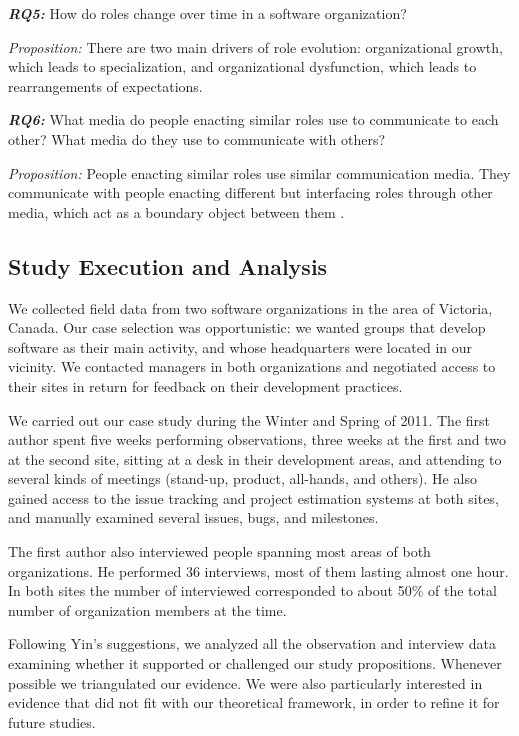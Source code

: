 \documentclass[10pt, conference, compsocconf]{IEEEtran}
\begin{document}
\textbf{\emph{RQ5:}} How do roles change over time in a software organization?

\emph{Proposition:} There are two main drivers of role evolution: organizational growth, which leads to specialization, and organizational dysfunction, which leads to rearrangements of expectations.

\textbf{\emph{RQ6:}} What media do people enacting similar roles use to communicate to each other? What media do they use to communicate with others?

\emph{Proposition:} People enacting similar roles use similar communication media. They communicate with people enacting different but interfacing roles through other media, which act as a boundary object between them \cite{Bowker1999}.



\subsection{Study Execution and Analysis}

We collected field data from two software organizations in the area of Victoria, Canada. Our case selection was opportunistic: we wanted groups that develop software as their main activity, and whose headquarters were located in our vicinity. We contacted managers in both organizations and negotiated access to their sites in return for feedback on their development practices.

We carried out our case study during the Winter and Spring of 2011. The first author spent five weeks performing observations, three weeks at the first and two at the second site, sitting at a desk in their development areas, and attending to several kinds of meetings (stand-up, product, all-hands, and others). He also gained access to the issue tracking and project estimation systems at both sites, and manually examined several issues, bugs, and milestones.

The first author also interviewed people spanning most areas of both organizations. He performed 36 interviews, most of them lasting almost one hour. In both sites the number of interviewed corresponded to about 50\% of the total number of organization members at the time.

Following Yin's \cite{Yin2003} suggestions, we analyzed all the observation and interview data examining whether it supported or challenged our study propositions. Whenever possible we triangulated our evidence. We were also particularly interested in evidence that did not fit with our theoretical framework, in order to refine it for future studies.
\end{document}
